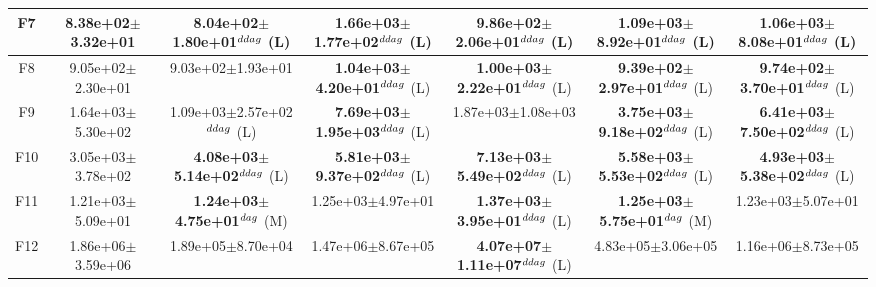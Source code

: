 \begin{table}[!t]
\begin{tabular}{c|cccccc}
F7  & 8.38e+02$\pm$3.32e+01  & 8.04e+02$\pm$1.80e+01$^{\\ddag}$ (L)  & \textbf{1.66e+03$\pm$1.77e+02}$^{\\ddag}$ (L)  & \textbf{9.86e+02$\pm$2.06e+01}$^{\\ddag}$ (L)  & \textbf{1.09e+03$\pm$8.92e+01}$^{\\ddag}$ (L)  & \textbf{1.06e+03$\pm$8.08e+01}$^{\\ddag}$ (L) \\ \hline
F8  & 9.05e+02$\pm$2.30e+01  & 9.03e+02$\pm$1.93e+01   & \textbf{1.04e+03$\pm$4.20e+01}$^{\\ddag}$ (L)  & \textbf{1.00e+03$\pm$2.22e+01}$^{\\ddag}$ (L)  & \textbf{9.39e+02$\pm$2.97e+01}$^{\\ddag}$ (L)  & \textbf{9.74e+02$\pm$3.70e+01}$^{\\ddag}$ (L) \\ \hline
F9  & 1.64e+03$\pm$5.30e+02  & 1.09e+03$\pm$2.57e+02$^{\\ddag}$ (L)  & \textbf{7.69e+03$\pm$1.95e+03}$^{\\ddag}$ (L)  & 1.87e+03$\pm$1.08e+03   & \textbf{3.75e+03$\pm$9.18e+02}$^{\\ddag}$ (L)  & \textbf{6.41e+03$\pm$7.50e+02}$^{\\ddag}$ (L) \\ \hline
F10  & 3.05e+03$\pm$3.78e+02  & \textbf{4.08e+03$\pm$5.14e+02}$^{\\ddag}$ (L)  & \textbf{5.81e+03$\pm$9.37e+02}$^{\\ddag}$ (L)  & \textbf{7.13e+03$\pm$5.49e+02}$^{\\ddag}$ (L)  & \textbf{5.58e+03$\pm$5.53e+02}$^{\\ddag}$ (L)  & \textbf{4.93e+03$\pm$5.38e+02}$^{\\ddag}$ (L) \\ \hline
F11  & 1.21e+03$\pm$5.09e+01  & \textbf{1.24e+03$\pm$4.75e+01}$^{\\dag}$ (M)  & 1.25e+03$\pm$4.97e+01   & \textbf{1.37e+03$\pm$3.95e+01}$^{\\ddag}$ (L)  & \textbf{1.25e+03$\pm$5.75e+01}$^{\\dag}$ (M)  & 1.23e+03$\pm$5.07e+01  \\ \hline
F12  & 1.86e+06$\pm$3.59e+06  & 1.89e+05$\pm$8.70e+04   & 1.47e+06$\pm$8.67e+05   & \textbf{4.07e+07$\pm$1.11e+07}$^{\\ddag}$ (L)  & 4.83e+05$\pm$3.06e+05   & 1.16e+06$\pm$8.73e+05  \\ \hline

\end{tabular}
\end{table}
